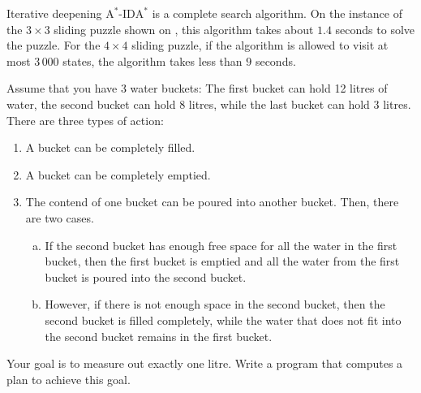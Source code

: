 Iterative deepening $\mathrm{A}^*$-$\mathrm{IDA}^*$ is a complete search algorithm. 
On the instance of the $3 \times 3$ sliding puzzle shown on , this
algorithm takes about $1.4$ seconds to solve the puzzle.  For the $4 \times 4$ sliding puzzle, if the algorithm
is allowed to visit at most $3\,000$ states, the algorithm takes less than $9$ seconds.  
\pagebreak

\exercise
Assume that you have 3 water buckets:  The first bucket can hold 12 litres of water, the second bucket can hold 8 litres,
while the last bucket can hold 3 litres.  There are three types of action:
\begin{enumerate}
\item A bucket can be completely filled.
\item A bucket can be completely emptied.
\item The contend of one bucket can be poured into another bucket.  Then, there are two cases.
      \begin{enumerate}[(a)]
      \item If the second bucket has enough free space for all the water in the first bucket, 
            then the first bucket is emptied and all the water from the first bucket is poured 
            into the second bucket.  
      \item However, if there is not enough space in the second bucket, then the second bucket is filled
            completely, while the water that does not fit into the second bucket remains in the first bucket.  
      \end{enumerate}
\end{enumerate}
Your goal is to measure out exactly one litre.  Write a program that computes a plan to achieve this goal.
\eox
\pagebreak

